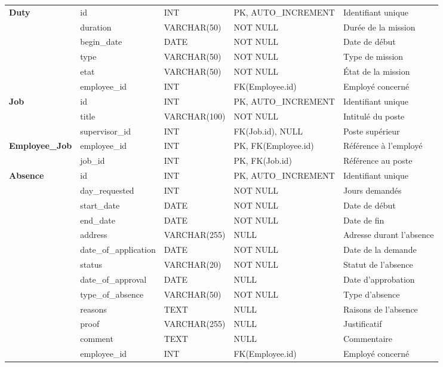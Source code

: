 \begin{longtable}{|p{2.5cm}|p{3cm}|p{3cm}|p{3cm}|p{3cm}|}
    \multirow{5}{*}{\textbf{Duty}} & id & INT & PK, AUTO\_INCREMENT & Identifiant unique \\
    \cline{2-5}
    & duration & VARCHAR(50) & NOT NULL & Durée de la mission \\
    \cline{2-5}
    & begin\_date & DATE & NOT NULL & Date de début \\
    \cline{2-5}
    & type & VARCHAR(50) & NOT NULL & Type de mission \\
    \cline{2-5}
    & etat & VARCHAR(50) & NOT NULL & État de la mission \\
    \cline{2-5}
    & employee\_id & INT & FK(Employee.id) & Employé concerné \\
    \hline

    \multirow{3}{*}{\textbf{Job}} & id & INT & PK, AUTO\_INCREMENT & Identifiant unique \\
    \cline{2-5}
    & title & VARCHAR(100) & NOT NULL & Intitulé du poste \\
    \cline{2-5}
    & supervisor\_id & INT & FK(Job.id), NULL & Poste supérieur \\
    \hline

    \multirow{2}{*}{\textbf{Employee\_Job}} & employee\_id & INT & PK, FK(Employee.id) & Référence à l'employé \\
    \cline{2-5}
    & job\_id & INT & PK, FK(Job.id) & Référence au poste \\
    \hline

    \multirow{12}{*}{\textbf{Absence}} & id & INT & PK, AUTO\_INCREMENT & Identifiant unique \\
    \cline{2-5}
    & day\_requested & INT & NOT NULL & Jours demandés \\
    \cline{2-5}
    & start\_date & DATE & NOT NULL & Date de début \\
    \cline{2-5}
    & end\_date & DATE & NOT NULL & Date de fin \\
    \cline{2-5}
    & address & VARCHAR(255) & NULL & Adresse durant l'absence \\
    \cline{2-5}
    & date\_of\_application & DATE & NOT NULL & Date de la demande \\
    \cline{2-5}
    & status & VARCHAR(20) & NOT NULL & Statut de l'absence \\
    \cline{2-5}
    & date\_of\_approval & DATE & NULL & Date d'approbation \\
    \cline{2-5}
    & type\_of\_absence & VARCHAR(50) & NOT NULL & Type d'absence \\
    \cline{2-5}
    & reasons & TEXT & NULL & Raisons de l'absence \\
    \cline{2-5}
    & proof & VARCHAR(255) & NULL & Justificatif \\
    \cline{2-5}
    & comment & TEXT & NULL & Commentaire \\
    \cline{2-5}
    & employee\_id & INT & FK(Employee.id) & Employé concerné \\
    \hline


\end{longtable}
